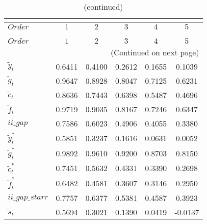  
\begin{center}
\begin{longtable}{lccccc} 
\caption{COEFFICIENTS OF AUTOCORRELATION}\\
 \label{Table:th_autocorr_matrix}\\
\toprule 
$Order                    $	 & 	 $         1$	 & 	 $         2$	 & 	 $         3$	 & 	 $         4$	 & 	 $         5$\\
\midrule \endfirsthead 
\caption{(continued)}\\
 \toprule \\ 
$Order                    $	 & 	 $         1$	 & 	 $         2$	 & 	 $         3$	 & 	 $         4$	 & 	 $         5$\\
\midrule \endhead 
\midrule \multicolumn{6}{r}{(Continued on next page)} \\ \bottomrule \endfoot 
\bottomrule \endlastfoot 
${\tilde y_t}             $	 & 	    0.6411	 & 	    0.4100	 & 	    0.2612	 & 	    0.1655	 & 	    0.1039 \\ 
${\tilde g_t}             $	 & 	    0.9647	 & 	    0.8928	 & 	    0.8047	 & 	    0.7125	 & 	    0.6231 \\ 
${\tilde c_t}             $	 & 	    0.8636	 & 	    0.7443	 & 	    0.6398	 & 	    0.5487	 & 	    0.4696 \\ 
${\tilde f_t}             $	 & 	    0.9719	 & 	    0.9035	 & 	    0.8167	 & 	    0.7246	 & 	    0.6347 \\ 
$ii\_gap                  $	 & 	    0.7586	 & 	    0.6023	 & 	    0.4906	 & 	    0.4055	 & 	    0.3380 \\ 
${\tilde y_t^*}           $	 & 	    0.5851	 & 	    0.3237	 & 	    0.1616	 & 	    0.0631	 & 	    0.0052 \\ 
${\tilde g_t^*}           $	 & 	    0.9892	 & 	    0.9610	 & 	    0.9200	 & 	    0.8703	 & 	    0.8150 \\ 
${\tilde c_t^*}           $	 & 	    0.7451	 & 	    0.5632	 & 	    0.4331	 & 	    0.3390	 & 	    0.2698 \\ 
${\tilde f_t^*}           $	 & 	    0.6482	 & 	    0.4581	 & 	    0.3607	 & 	    0.3146	 & 	    0.2950 \\ 
$ii\_gap\_starr           $	 & 	    0.7757	 & 	    0.6377	 & 	    0.5381	 & 	    0.4587	 & 	    0.3923 \\ 
${\tilde s_t}             $	 & 	    0.5694	 & 	    0.3021	 & 	    0.1390	 & 	    0.0419	 & 	   -0.0137 \\ 

\end{longtable}
\end{center}

